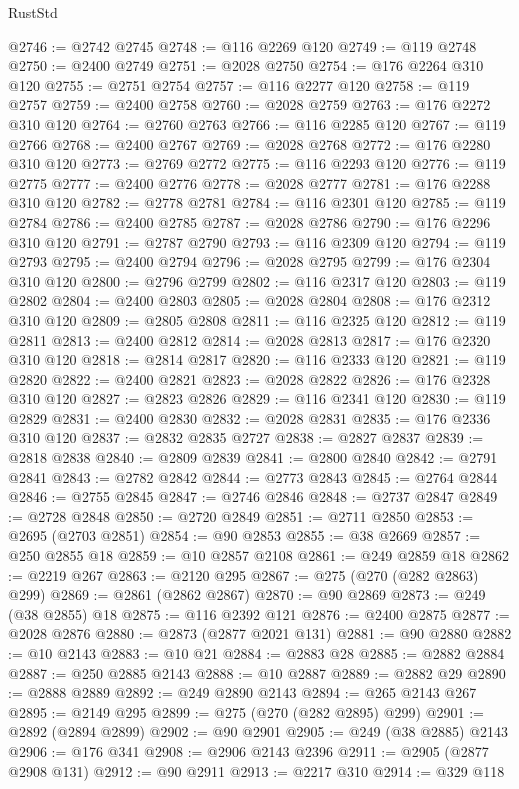 \begin{lexlean}{RustStd}
\begin{coremodule}
@2746 := @2742 @2745
@2748 := @116 @2269 @120
@2749 := @119 @2748
@2750 := @2400 @2749
@2751 := @2028 @2750
@2754 := @176 @2264 @310 @120
@2755 := @2751 @2754
@2757 := @116 @2277 @120
@2758 := @119 @2757
@2759 := @2400 @2758
@2760 := @2028 @2759
@2763 := @176 @2272 @310 @120
@2764 := @2760 @2763
@2766 := @116 @2285 @120
@2767 := @119 @2766
@2768 := @2400 @2767
@2769 := @2028 @2768
@2772 := @176 @2280 @310 @120
@2773 := @2769 @2772
@2775 := @116 @2293 @120
@2776 := @119 @2775
@2777 := @2400 @2776
@2778 := @2028 @2777
@2781 := @176 @2288 @310 @120
@2782 := @2778 @2781
@2784 := @116 @2301 @120
@2785 := @119 @2784
@2786 := @2400 @2785
@2787 := @2028 @2786
@2790 := @176 @2296 @310 @120
@2791 := @2787 @2790
@2793 := @116 @2309 @120
@2794 := @119 @2793
@2795 := @2400 @2794
@2796 := @2028 @2795
@2799 := @176 @2304 @310 @120
@2800 := @2796 @2799
@2802 := @116 @2317 @120
@2803 := @119 @2802
@2804 := @2400 @2803
@2805 := @2028 @2804
@2808 := @176 @2312 @310 @120
@2809 := @2805 @2808
@2811 := @116 @2325 @120
@2812 := @119 @2811
@2813 := @2400 @2812
@2814 := @2028 @2813
@2817 := @176 @2320 @310 @120
@2818 := @2814 @2817
@2820 := @116 @2333 @120
@2821 := @119 @2820
@2822 := @2400 @2821
@2823 := @2028 @2822
@2826 := @176 @2328 @310 @120
@2827 := @2823 @2826
@2829 := @116 @2341 @120
@2830 := @119 @2829
@2831 := @2400 @2830
@2832 := @2028 @2831
@2835 := @176 @2336 @310 @120
@2837 := @2832 @2835 @2727
@2838 := @2827 @2837
@2839 := @2818 @2838
@2840 := @2809 @2839
@2841 := @2800 @2840
@2842 := @2791 @2841
@2843 := @2782 @2842
@2844 := @2773 @2843
@2845 := @2764 @2844
@2846 := @2755 @2845
@2847 := @2746 @2846
@2848 := @2737 @2847
@2849 := @2728 @2848
@2850 := @2720 @2849
@2851 := @2711 @2850
@2853 := @2695 (@2703 @2851)
@2854 := @90 @2853
@2855 := @38 @2669
@2857 := @250 @2855 @18
@2859 := @10 @2857 @2108
@2861 := @249 @2859 @18
@2862 := @2219 @267
@2863 := @2120 @295
@2867 := @275 (@270 (@282 @2863) @299)
@2869 := @2861 (@2862 @2867)
@2870 := @90 @2869
@2873 := @249 (@38 @2855) @18
@2875 := @116 @2392 @121
@2876 := @2400 @2875
@2877 := @2028 @2876
@2880 := @2873 (@2877 @2021 @131)
@2881 := @90 @2880
@2882 := @10 @2143
@2883 := @10 @21
@2884 := @2883 @28
@2885 := @2882 @2884
@2887 := @250 @2885 @2143
@2888 := @10 @2887
@2889 := @2882 @29
@2890 := @2888 @2889
@2892 := @249 @2890 @2143
@2894 := @265 @2143 @267
@2895 := @2149 @295
@2899 := @275 (@270 (@282 @2895) @299)
@2901 := @2892 (@2894 @2899)
@2902 := @90 @2901
@2905 := @249 (@38 @2885) @2143
@2906 := @176 @341
@2908 := @2906 @2143 @2396
@2911 := @2905 (@2877 @2908 @131)
@2912 := @90 @2911
@2913 := @2217 @310
@2914 := @329 @118

\end{coremodule}
\end{lexlean}
